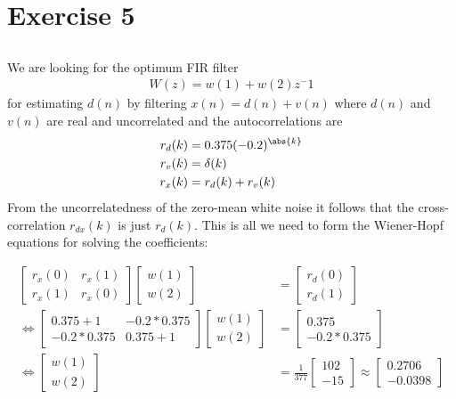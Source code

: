 
\section*{Exercise 5}

\subsection{}
We are looking for the optimum FIR filter
\begin{align}
	W(z)=w(1)+w(2)z^-1	
\end{align}
for estimating $d(n)$ by filtering $x(n)=d(n)+v(n)$ where $d(n)$ and $v(n)$
are real and uncorrelated and the autocorrelations are 
\begin{align}
	r_d(k)&=0.375(-0.2)^{\abs{k}}\\
	r_v(k)&=\delta(k)\\
	r_x(k)&=r_d(k)+r_v(k)
\end{align}
From the uncorrelatedness of the zero-mean white noise it follows that the cross-correlation
$r_{dx}(k)$ is just $r_{d}(k)$. This is all we need to form the Wiener-Hopf equations
for solving the coefficients:

\begin{align}
	\begin{bmatrix}
		r_x(0)&r_x(1)\\
		r_x(1)&r_x(0)
	\end{bmatrix}	
	\begin{bmatrix}
		w(1)\\
		w(2)
	\end{bmatrix}&=	
	\begin{bmatrix}
		r_d(0)\\
		r_d(1)
	\end{bmatrix}\\
\Leftrightarrow	
	\begin{bmatrix}
		0.375+1&-0.2*0.375\\
		-0.2*0.375&0.375+1
	\end{bmatrix}	
	\begin{bmatrix}
		w(1)\\
		w(2)
	\end{bmatrix}&=	
	\begin{bmatrix}
		0.375\\
		-0.2*0.375
	\end{bmatrix}\\		
\Leftrightarrow	
	\begin{bmatrix}
		w(1)\\
		w(2)
	\end{bmatrix}&=
	\frac{1}{377}	
	\begin{bmatrix}
		102\\
		-15
	\end{bmatrix}\approx		
	\begin{bmatrix}
	    0.2706\\
	   -0.0398
	\end{bmatrix}		
\end{align}

